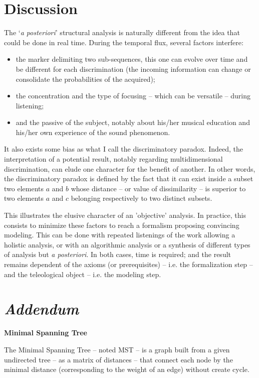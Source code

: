 \section{Discussion}
The `\textit{a posteriori}' structural analysis is naturally different from the idea that could be done in real time. During the temporal flux, several factors interfere:
\begin{itemize}
  \item the marker delimiting two sub-sequences, this one can evolve over time and be different for each discrimination (the incoming information can change or consolidate the probabilities of the acquired);
  \item the concentration and the type of focusing -- which can be versatile -- during listening;
  \item and the passive of the subject, notably about his/her musical education and his/her own experience of the sound phenomenon.
\end{itemize}

It also exists some bias as what I call the discriminatory paradox. Indeed, the interpretation of a potential result, notably regarding multidimensional discrimination, can elude one character for the benefit of another. In other words, the discriminatory paradox is defined by the fact that it can exist inside a subset two elements $a$ and $b$ whose distance -- or value of dissimilarity -- is superior to two elements $a$ and $c$ belonging respectively to two distinct subsets.

\bigskip

This illustrates the elusive character of an 'objective' analysis. In practice, this consists to minimize these factors to reach a formalism proposing convincing modeling. This can be done with repeated listenings of the work allowing a holistic analysis, or with an algorithmic analysis or a synthesis of different types of analysis but \textit{a posteriori}. In both cases, time is required; and the result remains dependent of the axioms (or prerequisites) -- i.e. the formalization step -- and the teleological object -- i.e. the modeling step.

\section{\textit{Addendum}}
\label{amst}

\textbf{Minimal Spanning Tree}
\smallskip

The Minimal Spanning Tree -- noted MST -- is a graph built from a given undirected tree -- as a matrix of distances -- that connect each node by the minimal distance (corresponding to the weight of an edge) without create cycle. 

